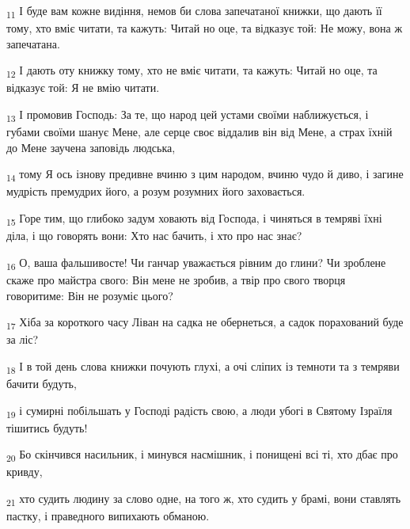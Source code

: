 \begin{tcolorbox}
\textsubscript{11} І буде вам кожне видіння, немов би слова запечатаної книжки, що дають її тому, хто вміє читати, та кажуть: Читай но оце, та відказує той: Не можу, вона ж запечатана.
\end{tcolorbox}
\begin{tcolorbox}
\textsubscript{12} І дають оту книжку тому, хто не вміє читати, та кажуть: Читай но оце, та відказує той: Я не вмію читати.
\end{tcolorbox}
\begin{tcolorbox}
\textsubscript{13} І промовив Господь: За те, що народ цей устами своїми наближується, і губами своїми шанує Мене, але серце своє віддалив він від Мене, а страх їхній до Мене заучена заповідь людська,
\end{tcolorbox}
\begin{tcolorbox}
\textsubscript{14} тому Я ось ізнову предивне вчиню з цим народом, вчиню чудо й диво, і загине мудрість премудрих його, а розум розумних його заховається.
\end{tcolorbox}
\begin{tcolorbox}
\textsubscript{15} Горе тим, що глибоко задум ховають від Господа, і чиняться в темряві їхні діла, і що говорять вони: Хто нас бачить, і хто про нас знає?
\end{tcolorbox}
\begin{tcolorbox}
\textsubscript{16} О, ваша фальшивосте! Чи ганчар уважається рівним до глини? Чи зроблене скаже про майстра свого: Він мене не зробив, а твір про свого творця говоритиме: Він не розуміє цього?
\end{tcolorbox}
\begin{tcolorbox}
\textsubscript{17} Хіба за короткого часу Ліван на садка не обернеться, а садок порахований буде за ліс?
\end{tcolorbox}
\begin{tcolorbox}
\textsubscript{18} І в той день слова книжки почують глухі, а очі сліпих із темноти та з темряви бачити будуть,
\end{tcolorbox}
\begin{tcolorbox}
\textsubscript{19} і сумирні побільшать у Господі радість свою, а люди убогі в Святому Ізраїля тішитись будуть!
\end{tcolorbox}
\begin{tcolorbox}
\textsubscript{20} Бо скінчився насильник, і минувся насмішник, і понищені всі ті, хто дбає про кривду,
\end{tcolorbox}
\begin{tcolorbox}
\textsubscript{21} хто судить людину за слово одне, на того ж, хто судить у брамі, вони ставлять пастку, і праведного випихають обманою.
\end{tcolorbox}

